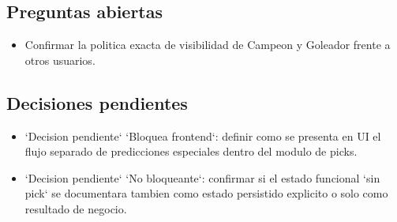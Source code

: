 \subsection{Preguntas abiertas}

\begin{itemize}
  \item Confirmar la politica exacta de visibilidad de Campeon y Goleador frente a otros usuarios.
\end{itemize}

\subsection{Decisiones pendientes}

\begin{itemize}
  \item `Decision pendiente` `Bloquea frontend`: definir como se presenta en UI el flujo separado de predicciones especiales dentro del modulo de picks.
  \item `Decision pendiente` `No bloqueante`: confirmar si el estado funcional `sin pick` se documentara tambien como estado persistido explicito o solo como resultado de negocio.
\end{itemize}
